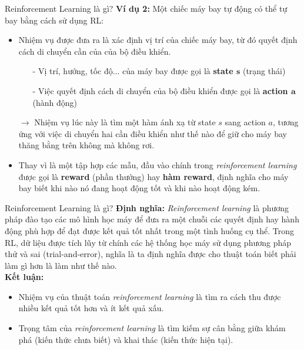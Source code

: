 \documentclass[10pt,aspectratio=169]{beamer}
\begin{document}
\begin{frame}{Reinforcement Learning là gì?}
\textbf{Ví dụ 2:} Một chiếc máy bay tự động có thể tự bay bằng cách sử dụng RL:
\begin{itemize}
\setlength\itemsep{8pt}
\item Nhiệm vụ được đưa ra là xác định vị trí của chiếc máy bay, từ đó quyết định cách di chuyển cần của của bộ điều khiển.
\begin{itemize}
\setlength\itemsep{4pt}
\item[-] Vị trí, hướng, tốc độ... của máy bay được gọi là \textbf{state $ \boldsymbol{s} $} (trạng thái)
\item[-] Việc quyết định cách di chuyển của bộ điều khiển được gọi là \textbf{action $ \boldsymbol{a} $} (hành động) 
\end{itemize}
\item[] $ \longrightarrow $ Nhiệm vụ lúc này là tìm một hàm ánh xạ từ state $ s $ sang action $ a $, tương ứng với việc di chuyển hai cần điều khiển như thế nào để giữ cho máy bay thăng bằng trên không mà không rơi.
\item Thay vì là một tập hợp các mẫu, đầu vào chính trong \textcolor{mainblue}{\textit{reinforcement learning}} được gọi là \textbf{reward} (phần thưởng) hay \textbf{hàm reward}, định nghĩa cho máy bay biết khi nào nó đang hoạt động tốt và khi nào hoạt động kém.
\end{itemize}
\end{frame}

\begin{frame}{Reinforcement Learning là gì?}
\textbf{Định nghĩa:} \textcolor{mainblue}{\textit{Reinforcement learning}} là phương pháp đào tạo các mô hình học máy để đưa ra một chuỗi các quyết định hay hành động phù hợp để đạt được kết quả tốt nhất trong một tình huống cụ thể. Trong RL, dữ liệu được tích lũy từ chính các hệ thống học máy sử dụng phương pháp thử và sai (trial-and-error), nghĩa là ta định nghĩa được cho thuật toán biết phải làm gì hơn là làm như thế nào.\\
\vspace{12pt}
\textbf{Kết luận:}
\begin{itemize}
\setlength\itemsep{8pt}
\item Nhiệm vụ của thuật toán \textcolor{mainblue}{\textit{reinforcement learning}} là tìm ra cách thu được nhiều kết quả tốt hơn và ít kết quả xấu.
\item Trọng tâm của \textcolor{mainblue}{\textit{reinforcement learning}} là tìm kiếm sự cân bằng giữa khám phá (kiến thức chưa biết) và khai thác (kiến thức hiện tại)\footnotemark.
\end{itemize}
\end{frame}
\end{document}
